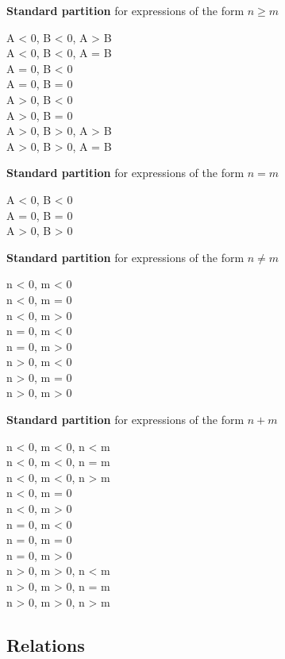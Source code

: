 \noindent\textbf{Standard partition} for expressions of the form $n \geq m$
\begin{zed}
A < 0, B < 0, A > B\\
A < 0, B < 0, A = B\\
A = 0, B < 0\\
A = 0, B = 0\\
A > 0, B < 0\\
A > 0, B = 0\\
A > 0, B > 0, A > B\\
A > 0, B > 0, A = B
\end{zed}

\noindent\textbf{Standard partition} for expressions of the form $n = m$
\begin{zed}
A < 0, B < 0\\
A = 0, B = 0\\
A > 0, B > 0
\end{zed}


\noindent\textbf{Standard partition} for expressions of the form $n \neq m$
\begin{zed}
n < 0, m < 0 \\
n < 0, m = 0 \\
n < 0, m > 0 \\
n = 0, m < 0 \\
n = 0, m > 0 \\
n > 0, m < 0 \\
n > 0, m = 0 \\
n > 0, m > 0 
\end{zed}

\noindent\textbf{Standard partition} for expressions of the form $n + m$
\begin{zed}
n < 0, m < 0, n < m \\
n < 0, m < 0, n = m \\
n < 0, m < 0, n > m \\
n < 0, m = 0 \\
n < 0, m > 0 \\
n = 0, m < 0 \\
n = 0, m = 0 \\
n = 0, m > 0 \\
n > 0, m > 0, n < m \\
n > 0, m > 0, n = m \\
n > 0, m > 0, n > m
\end{zed}


\subsection{Relations}

